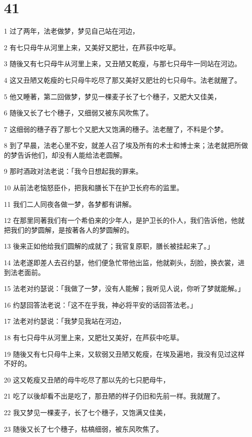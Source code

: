\chapter{41}

\par 1 过了两年，法老做梦，梦见自己站在河边，
\par 2 有七只母牛从河里上来，又美好又肥壮，在芦荻中吃草。
\par 3 随後又有七只母牛从河里上来，又丑陋又乾瘦，与那七只母牛一同站在河边。
\par 4 这又丑陋又乾瘦的七只母牛吃尽了那又美好又肥壮的七只母牛。法老就醒了。
\par 5 他又睡著，第二回做梦，梦见一棵麦子长了七个穗子，又肥大又佳美，
\par 6 随後又长了七个穗子，又细弱又被东风吹焦了。
\par 7 这细弱的穗子吞了那七个又肥大又饱满的穗子。法老醒了，不料是个梦。
\par 8 到了早晨，法老心里不安，就差人召了埃及所有的术士和博士来；法老就把所做的梦告诉他们，却没有人能给法老圆解。
\par 9 那时酒政对法老说：「我今日想起我的罪来。
\par 10 从前法老恼怒臣仆，把我和膳长下在护卫长府布的监里。
\par 11 我们二人同夜各做一梦，各梦都有讲解。
\par 12 在那里同著我们有一个希伯来的少年人，是护卫长的仆人，我们告诉他，他就把我们的梦圆解，是按著各人的梦圆解的。
\par 13 後来正如他给我们圆解的成就了；我官复原职，膳长被挂起来了。」
\par 14 法老遂即差人去召约瑟，他们便急忙带他出监，他就剃头，刮脸，换衣裳，进到法老面前。
\par 15 法老对约瑟说：「我做了一梦，没有人能解；我听见人说，你听了梦就能解。」
\par 16 约瑟回答法老说：「这不在乎我，神必将平安的话回答法老。」
\par 17 法老对约瑟说：「我梦见我站在河边，
\par 18 有七只母牛从河里上来，又肥壮又美好，在芦荻中吃草。
\par 19 随後又有七只母牛上来，又软弱又丑陋又乾瘦，在埃及遍地，我没有见过这样不好的。
\par 20 这又乾瘦又丑陋的母牛吃尽了那以先的七只肥母牛，
\par 21 吃了以後却看不出是吃了，那丑陋的样子仍旧和先前一样。我就醒了。
\par 22 我又梦见一棵麦子，长了七个穗子，又饱满又佳美，
\par 23 随後又长了七个穗子，枯槁细弱，被东风吹焦了。
